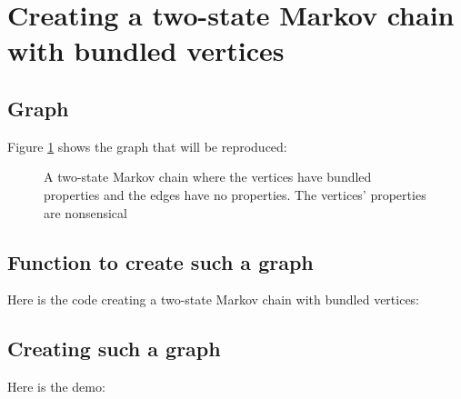\section{Creating a two-state Markov chain with bundled vertices}
\label{subsec:create_bundled_vertices_markov_chain}

\subsection{Graph}

Figure \ref{fig:bundled_vertices_markov_chain} 
shows the graph that will be reproduced:

\begin{figure}
  \caption{
    A two-state Markov chain where the vertices have bundled properties and
    the edges have no properties.
    The vertices' properties are nonsensical
  }
  \label{fig:bundled_vertices_markov_chain}
\end{figure}

\subsection{Function to create such a graph}

Here is the code creating a two-state Markov chain with bundled vertices:



\subsection{Creating such a graph}

Here is the demo:

